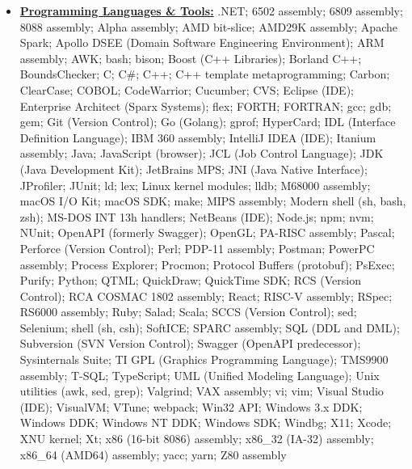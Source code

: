 \documentclass[letterpaper,11pt]{article}
\begin{document}
\begin{multicols}{3}
{\begin{itemize}[leftmargin=0.1in, label={}, itemsep=0pt, parsep=0pt, topsep=0pt, partopsep=0pt]
\item
    \textbf{\uline{Programming Languages \& Tools:}}  \hspace{0pt}
    .NET;
    6502 assembly;
    6809 assembly;
    8088 assembly;
    Alpha assembly;
    AMD bit-slice;
    AMD29K assembly;
    Apache Spark;
    Apollo DSEE (Domain Software Engineering Environment);
    ARM assembly;
    AWK;
    bash;
    bison;
    Boost (C++ Libraries);
    Borland C++;
    BoundsChecker;
    C;
    C\#;
    C++;
    C++ template metaprogramming;
    Carbon;
    ClearCase;
    COBOL;
    CodeWarrior;
    Cucumber;
    CVS;
    Eclipse (IDE);
    Enterprise Architect (Sparx Systems);
    flex;
    FORTH;
    FORTRAN;
    gcc;
    gdb;
    gem;
    Git (Version Control);
    Go (Golang);
    gprof;
    HyperCard;
    IDL (Interface Definition Language);
    IBM 360 assembly;
    IntelliJ IDEA (IDE);
    Itanium assembly;
    Java;
    JavaScript (browser);
    JCL (Job Control Language);
    JDK (Java Development Kit);
    JetBrains MPS;
    JNI (Java Native Interface);
    JProfiler;
    JUnit;
    ld;
    lex;
    Linux kernel modules;
    lldb;
    M68000 assembly;
    macOS I/O Kit;
    macOS SDK;
    make;
    MIPS assembly;
    Modern shell (sh, bash, zsh);
    MS-DOS INT 13h handlers;
    NetBeans (IDE);
    Node.js;
    npm;
    nvm;
    NUnit;
    OpenAPI (formerly Swagger);
    OpenGL;
    PA-RISC assembly;
    Pascal;
    Perforce (Version Control);
    Perl;
    PDP-11 assembly;
    Postman;
    PowerPC assembly;
    Process Explorer;
    Procmon;
    Protocol Buffers (protobuf);
    PsExec;
    Purify;
    Python;
    QTML;
    QuickDraw;
    QuickTime SDK;
    RCS (Version Control);
    RCA COSMAC 1802 assembly;
    React;
    RISC-V assembly;
    RSpec;
    RS6000 assembly;
    Ruby;
    Salad;
    Scala;
    SCCS (Version Control);
    sed;
    Selenium;
    shell (sh, csh);
    SoftICE;
    SPARC assembly;
    SQL (DDL and DML);
    Subversion (SVN Version Control);
    Swagger (OpenAPI predecessor);
    Sysinternals Suite;
    TI GPL (Graphics Programming Language);
    TMS9900 assembly;
    T-SQL;
    TypeScript;
    UML (Unified Modeling Language);
    Unix utilities (awk, sed, grep);
    Valgrind;
    VAX assembly;
    vi;
    vim;
    Visual Studio (IDE);
    VisualVM;
    VTune;
    webpack;
    Win32 API;
    Windows 3.x DDK;
    Windows DDK;
    Windows NT DDK;
    Windows SDK;
    Windbg;
    X11;
    Xcode;
    XNU kernel;
    Xt;
    x86 (16-bit 8086) assembly;
    x86\_32 (IA-32) assembly;
    x86\_64 (AMD64) assembly;
    yacc;
    yarn;
    Z80 assembly

\end{itemize}}
\end{multicols}
\end{document}
